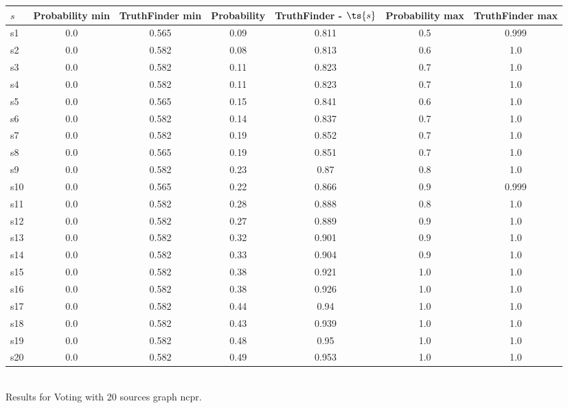 \documentclass{article}
\begin{document}
\noindent\begin{tabular}{|l|c|c|c|c|c|c|}
\hline
$s$& Probability min & TruthFinder min & Probability & TruthFinder - $\ts{s}$ & Probability max & TruthFinder max\\
\hline
s1 &0.0 & 0.565 & 0.09 & 0.811 & 0.5 & 0.999\\
\hline
s2 &0.0 & 0.582 & 0.08 & 0.813 & 0.6 & 1.0\\
\hline
s3 &0.0 & 0.582 & 0.11 & 0.823 & 0.7 & 1.0\\
\hline
s4 &0.0 & 0.582 & 0.11 & 0.823 & 0.7 & 1.0\\
\hline
s5 &0.0 & 0.565 & 0.15 & 0.841 & 0.6 & 1.0\\
\hline
s6 &0.0 & 0.582 & 0.14 & 0.837 & 0.7 & 1.0\\
\hline
s7 &0.0 & 0.582 & 0.19 & 0.852 & 0.7 & 1.0\\
\hline
s8 &0.0 & 0.565 & 0.19 & 0.851 & 0.7 & 1.0\\
\hline
s9 &0.0 & 0.582 & 0.23 & 0.87 & 0.8 & 1.0\\
\hline
s10 &0.0 & 0.565 & 0.22 & 0.866 & 0.9 & 0.999\\
\hline
s11 &0.0 & 0.582 & 0.28 & 0.888 & 0.8 & 1.0\\
\hline
s12 &0.0 & 0.582 & 0.27 & 0.889 & 0.9 & 1.0\\
\hline
s13 &0.0 & 0.582 & 0.32 & 0.901 & 0.9 & 1.0\\
\hline
s14 &0.0 & 0.582 & 0.33 & 0.904 & 0.9 & 1.0\\
\hline
s15 &0.0 & 0.582 & 0.38 & 0.921 & 1.0 & 1.0\\
\hline
s16 &0.0 & 0.582 & 0.38 & 0.926 & 1.0 & 1.0\\
\hline
s17 &0.0 & 0.582 & 0.44 & 0.94 & 1.0 & 1.0\\
\hline
s18 &0.0 & 0.582 & 0.43 & 0.939 & 1.0 & 1.0\\
\hline
s19 &0.0 & 0.582 & 0.48 & 0.95 & 1.0 & 1.0\\
\hline
s20 &0.0 & 0.582 & 0.49 & 0.953 & 1.0 & 1.0\\
\hline
\end{tabular}\\

\noindent Results for Voting with 20 sources graph ncpr.
\end{document}

